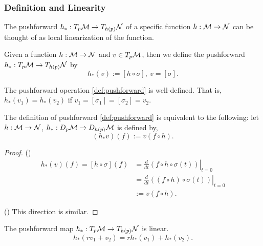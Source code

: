 \documentclass[../main.tex]{subfiles}
\begin{document}
    \subsubsection{Definition and Linearity}
    \begin{remark}
        The pushforward \(h_* : T_p\manifold[M] \to 
        T_{h(p)}\manifold[N]\) of a specific function \(h : \manifold[M] \to 
        \manifold[N]\) can be thought of as local linearization of the function.
        
    \end{remark}
    \begin{definition}[Pushforward]\label{def:pushforward}
        Given a function \(h : \manifold[M] \to \manifold[N]\) and 
        \(v \in T_p\manifold[M]\), then we define the pushforward 
        \(h_* : T_p\manifold[M] \to T_{h(p)}\manifold[N]\) by 
        \[
        h_*(v) := [h \circ \sigma],~v=[\sigma].
        \]
    \end{definition}
    \begin{theorem}
        The pushforward operation \cref{def:pushforward} is well-defined. That is, 
        \(h_*(v_1) = h_*(v_2)\) if \(v_1 = [\sigma_1] = [\sigma_2] = v_2\).
    \end{theorem}
    \begin{theorem}\label{thm:algebraic-pushforward}
        The definition of pushforward \cref{def:pushforward} is equivalent to the 
        following: let \(h : \manifold[M] \to \manifold[N]\), \(h_* : 
        D_p\manifold[M] \to D_{h(p)}\manifold[M]\) is defined by,
        \[
        (h_*v)(f) := v(f\circ h).
        \]
    \end{theorem}
    \begin{proof}
        (\textrightarrow) 
        \[
        \begin{aligned}
            h_*(v)(f) = [h \circ \sigma](f) 
            &= \left.\frac{d}{dt}(f\circ h\circ\sigma(t))\right|_{t=0} \\
            &= \left.\frac{d}{dt}((f\circ h)\circ\sigma(t))\right|_{t=0} \\
            &:= v(f\circ h).
        \end{aligned}
        \] \par
        (\textleftarrow) This direction is similar.
    \end{proof}
    \begin{theorem}\label{thm:linearity-of-pushforward}
        The pushforward map \(h_* : T_p\manifold[M] \to T_{h(p)}\manifold[N]\) 
        is linear.
        \[
        h_*(rv_1+v_2) = rh_*(v_1) + h_*(v_2).
        \]
    \end{theorem}
\end{document}
